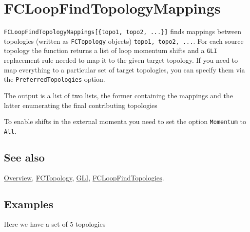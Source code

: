 \documentclass[../FeynCalcManual.tex]{subfiles}
\begin{document}
\begin{Shaded}
\begin{Highlighting}[]
 
\end{Highlighting}
\end{Shaded}

\hypertarget{fcloopfindtopologymappings}{
\section{FCLoopFindTopologyMappings}\label{fcloopfindtopologymappings}}

\texttt{FCLoopFindTopologyMappings[\allowbreak{}\{\allowbreak{}topo1,\ \allowbreak{}topo2,\ \allowbreak{}...\}]}
finds mappings between topologies (written as \texttt{FCTopology}
objects) \texttt{topo1,\ \allowbreak{}topo2,\ \allowbreak{}...}. For
each source topology the function returns a list of loop momentum shifts
and a \texttt{GLI} replacement rule needed to map it to the given target
topology. If you need to map everything to a particular set of target
topologies, you can specify them via the \texttt{PreferredTopologies}
option.

The output is a list of two lists, the former containing the mappings
and the latter enumerating the final contributing topologies

To enable shifts in the external momenta you need to set the option
\texttt{Momentum} to \texttt{All}.

\subsection{See also}

\hyperlink{toc}{Overview}, \hyperlink{fctopology}{FCTopology},
\hyperlink{gli}{GLI},
\hyperlink{fcloopfindtopologies}{FCLoopFindTopologies}.

\subsection{Examples}

Here we have a set of 5 topologies
\end{document}
